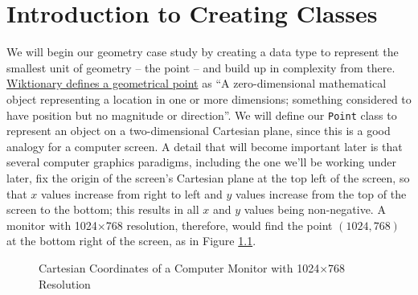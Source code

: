 
\chapter{Introduction to Creating Classes}
\label{chapter:classes}

\minitoc


We will begin our geometry case study by creating a data type to represent the smallest unit of geometry -- the point -- and build up in complexity from there.  \href{https://en.wiktionary.org/wiki/point}{Wiktionary defines a geometrical point} as ``A zero-dimensional mathematical object representing a location in one or more dimensions; something considered to have position but no magnitude or direction''.  We will define our \texttt{Point} class to represent an object on a two-dimensional Cartesian plane, since this is a good analogy for a computer screen.  A detail that will become important later is that several computer graphics paradigms, including the one we'll be working under later, fix the origin of the screen's Cartesian plane at the top left of the screen, so that $x$ values increase from right to left and $y$ values increase from the top of the screen to the bottom; this results in all $x$ and $y$ values being non-negative.  A monitor with 1024$\times$768 resolution, therefore, would find the point $(1024,768)$ at the bottom right of the screen, as in Figure \ref{fig:monitor}.

\begin{figure}[ht]
    \color{nccblue}
    \begin{center}
    \end{center}
    \caption{Cartesian Coordinates of a Computer Monitor with 1024$\times$768 Resolution}
    \label{fig:monitor}
\end{figure}


